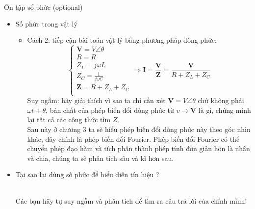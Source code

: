 \documentclass[8pt]{beamer}
\begin{document}
\begin{frame}{Ôn tập số phức (optional)}
\begin{itemize}
	\item Số phức trong vật lý
		\begin{itemize}
	\item Cách 2: tiếp cận bài toán vật lý bằng phương pháp dòng phức:
\begin{equation*}
	\begin{cases}
		\textbf{V}=V\angle \theta \\
		R = R \\
		Z_{L}=j\omega L \\
		Z_{C}=\frac{1}{j\omega C} \\
		\textbf{Z}=R+Z_{L}+Z_{C} \\
	\end{cases}
	\Rightarrow \textbf{I}=\frac{\textbf{V}}{\textbf{Z}}=\frac{\textbf{V}}{R+Z_{L}+Z_{C}}
\end{equation*}
Suy ngẫm: hãy giải thích vì sao ta chỉ cần xét $\textbf{V}=V\angle \theta$ chứ không phải $\omega t+ \theta$, bản chất của phép biển đổi dòng phức từ $v\to \textbf{V}$ là gì, chứng minh lại tất cả các công thức tìm $Z$.
\\ Sau này ở chương $3$ ta sẽ hiểu phép biến đổi dòng phức này theo góc nhìn khác, đây chính là phép biến đổi \alert{Fourier}. Phép biến đổi \alert{Fourier} có thể chuyển phép đạo hàm và tích phân thành phép tính đơn giản hơn là nhân và chia, chúng ta sẽ phân tích sâu và kĩ hơn sau.
\end{itemize}
\item Tại sao lại dùng số phức để biểu diễn tín hiệu ?

	\\ \alert{Các bạn hãy tự suy ngẫm và phân tích để tìm ra câu trả lời của chính mình!}
\end{itemize}
\end{frame}
\end{document}
